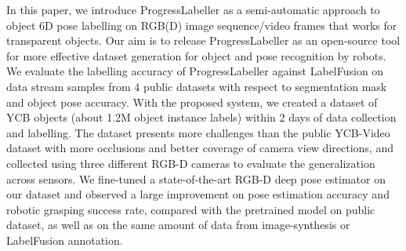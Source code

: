 In this paper, we introduce ProgressLabeller as a semi-automatic approach to object 6D pose labelling on RGB(D) image sequence/video frames that works for transparent objects.  Our aim is to release ProgressLabeller as an open-source tool for more effective dataset generation for object and pose recognition by robots.
We evaluate the labelling accuracy of ProgressLabeller against LabelFusion on data stream samples from 4 public datasets with respect to segmentation mask and object pose accuracy. With the proposed system, we created a dataset of YCB objects \cite{calli2015ycb} (about 1.2M object instance labels) within 2 days of data collection and labelling. The dataset presents more challenges than the public YCB-Video dataset \cite{xiang2017posecnn} with more occlusions and better coverage of camera view directions, and collected using three different RGB-D cameras to evaluate the generalization across sensors. We fine-tuned a state-of-the-art RGB-D deep pose estimator \cite{he2021ffb6d} on our dataset and observed a large improvement on pose estimation accuracy and robotic grasping success rate, compared with the pretrained model on public dataset, as well as on the same amount of data from image-synthesis or LabelFusion annotation.  

